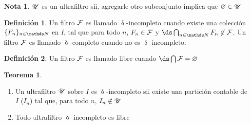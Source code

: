 \documentclass{article}
\theoremstyle{definition}
\newtheorem{definition}{Definición}[section]
\newtheorem{theorem}{Teorema}[section]
\newtheorem*{note}{Nota}
\theoremstyle{theorem*}
\begin{document}
\begin{note}
  $\mathscr{U}$ es un ultrafiltro sii, agregarle otro subconjunto implica que $\varnothing \in \mathscr{U}$
\end{note}


\begin{definition}
  Un filtro $\mathcal{F}$ es llamado $\updelta$-incompleto cuando existe una colección
  $\{F_n\}_{n\in\N}$ en $I$, tal que para todo $n$, $F_n \in \mathcal{F}$ y
  $\ds\bigcap_{n\in\N} F_n \not\in \F$. Un filtro $\mathcal{F}$ es llamado $\updelta$-completo
  cuando no es $\updelta$-incompleto.
\end{definition}
\begin{definition}
  Un filtro $\mathcal{F}$ es llamado libre cuando $\ds\bigcap\F = \varnothing$
\end{definition}

\begin{theorem}
  \begin{enumerate}
    \item Un ultrafiltro $\mathscr{U}$ sobre $I$ es $\updelta$-incompleto sii existe
          una partición contable de $I$ ($I_n$) tal que, para todo $n$,
          $I_n \not\in \mathscr{U}$
    \item Todo ultrafiltro $\updelta$-incompleto es libre
  \end{enumerate}
\end{theorem}
\end{document}
